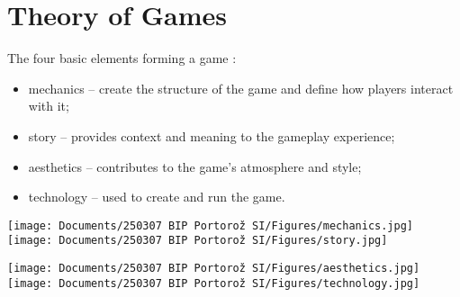 
\section{Theory of Games}

\begin{frame}[standout]
    \onslide<+->
\end{frame}

\begin{frame}{\insertsection}
    \onslide<+->
    \begin{multicols}{2}
        The four basic elements forming a game \cite{schell2019ArtGameDesign}:
    
        \begin{itemize}
            \item mechanics -- create the structure of the game and define how players interact with it;
            \item story -- provides context and meaning to the gameplay experience;
            \item aesthetics -- contributes to the game's atmosphere and style;
            \item technology -- used to create and run the game.
        \end{itemize}

        \columnbreak

        \begin{center}
                \texttt{[image: Documents/250307 BIP Portorož SI/Figures/mechanics.jpg]}
            \hspace{1em}
                \texttt{[image: Documents/250307 BIP Portorož SI/Figures/story.jpg]}
    
            \vspace{1em}
            
            \noindent
                \texttt{[image: Documents/250307 BIP Portorož SI/Figures/aesthetics.jpg]}
            \hspace{1em}
                \texttt{[image: Documents/250307 BIP Portorož SI/Figures/technology.jpg]}
        \end{center}
        
    \end{multicols}
\end{frame}



